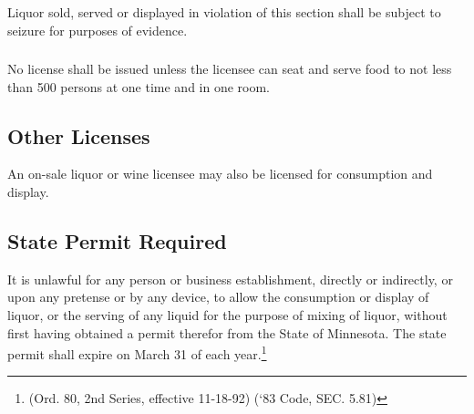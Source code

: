 \subsubsection{}
Liquor sold, served or displayed in violation of this section shall be subject to seizure for purposes of evidence.
\subsubsection{}
No license shall be issued unless the licensee can seat and serve food to not less than 500 persons at one time and in one room.
\subsection{Other Licenses}
An on-sale liquor or wine licensee may also be licensed for consumption and display.
\subsection{State Permit Required}
It is unlawful for any person or business establishment, directly or indirectly, or upon any pretense or by any device, to allow the consumption or display of liquor, or the serving of any liquid for the purpose of mixing of liquor, without first having obtained a permit therefor from the State of Minnesota.  The state permit shall expire on March 31 of each year.\footnote{(Ord. 80, 2nd Series, effective 11-18-92) (‘83 Code, SEC. 5.81)}
